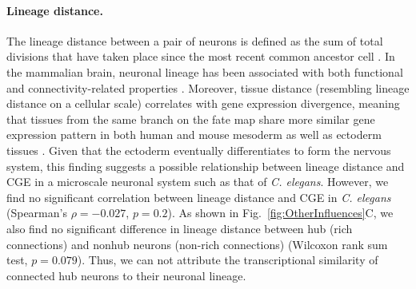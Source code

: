 \documentclass[10pt,letterpaper]{article}
\begin{document}
{\paragraph{Lineage distance.}
The lineage distance between a pair of neurons is defined as the sum of total divisions that have taken place since the most recent common ancestor cell \cite{Pavlovic:2014gx, Sulston1977, Sulston1983}.
In the mammalian brain, neuronal lineage has been associated with both functional \cite{Ciceri2013, Li2012} and connectivity-related properties \cite{Yu2012}.
Moreover, tissue distance (resembling lineage distance on a cellular scale) correlates with gene expression divergence, meaning that tissues from the same branch on the fate map share more similar gene expression pattern in both human and mouse mesoderm as well as ectoderm tissues \cite{Cui2007}.
Given that the ectoderm eventually differentiates to form the nervous system, this finding suggests a possible relationship between lineage distance and CGE in a microscale neuronal system such as that of \textit{C. elegans}.
However, we find no significant correlation between lineage distance and CGE in \textit{C. elegans} (Spearman's $\rho = -0.027$, $p = 0.2$).
As shown in Fig.~\ref{fig:OtherInfluences}C, we also find no significant difference in lineage distance between hub (rich connections) and nonhub neurons (non-rich connections) (Wilcoxon rank sum test, $p = 0.079$).
Thus, we can not attribute the transcriptional similarity of connected hub neurons to their neuronal lineage.


}
\end{document}
